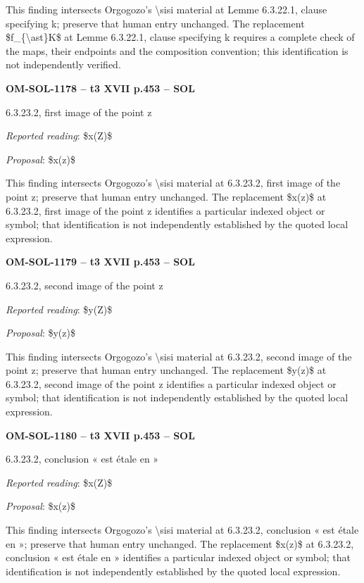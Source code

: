 This finding intersects Orgogozo's \textbackslash{}sisi material at Lemme 6.3.22.1, clause specifying k; preserve that human entry unchanged. The replacement \$f\_\{\textbackslash{}ast\}K\$ at Lemme 6.3.22.1, clause specifying k requires a complete check of the maps, their endpoints and the composition convention; this identification is not independently verified.\par
\par\noindent\textbf{OM-SOL-1178 -- t3 XVII p.453 -- SOL}\par
6.3.23.2, first image of the point z\par
\emph{Reported reading}: \$x(Z)\$\par
\emph{Proposal}: \$x(z)\$\par
This finding intersects Orgogozo's \textbackslash{}sisi material at 6.3.23.2, first image of the point z; preserve that human entry unchanged. The replacement \$x(z)\$ at 6.3.23.2, first image of the point z identifies a particular indexed object or symbol; that identification is not independently established by the quoted local expression.\par
\par\noindent\textbf{OM-SOL-1179 -- t3 XVII p.453 -- SOL}\par
6.3.23.2, second image of the point z\par
\emph{Reported reading}: \$y(Z)\$\par
\emph{Proposal}: \$y(z)\$\par
This finding intersects Orgogozo's \textbackslash{}sisi material at 6.3.23.2, second image of the point z; preserve that human entry unchanged. The replacement \$y(z)\$ at 6.3.23.2, second image of the point z identifies a particular indexed object or symbol; that identification is not independently established by the quoted local expression.\par
\par\noindent\textbf{OM-SOL-1180 -- t3 XVII p.453 -- SOL}\par
6.3.23.2, conclusion « est étale en »\par
\emph{Reported reading}: \$x(Z)\$\par
\emph{Proposal}: \$x(z)\$\par
This finding intersects Orgogozo's \textbackslash{}sisi material at 6.3.23.2, conclusion « est étale en »; preserve that human entry unchanged. The replacement \$x(z)\$ at 6.3.23.2, conclusion « est étale en » identifies a particular indexed object or symbol; that identification is not independently established by the quoted local expression.\par
